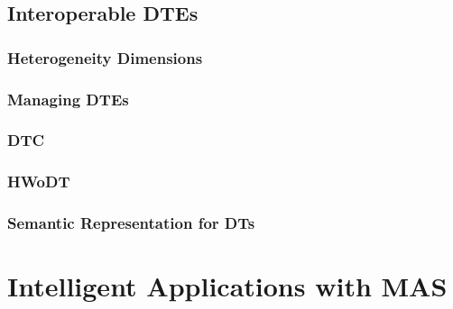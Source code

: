 \documentclass[12pt,a4paper,openright,twoside]{book}
\begin{document}
\chapter{Interoperable \aclp{DTE}}
\label{chap:digital-twin-ecosystem}

\section{Heterogeneity Dimensions}

\section{Managing \aclp{DTE}}


\section{\acl{DTC}}


\section{\acl{HWoDT}}

\section{Semantic Representation for \aclp{DT}}


\part{Intelligent Applications with \acl{MAS}}
\end{document}
